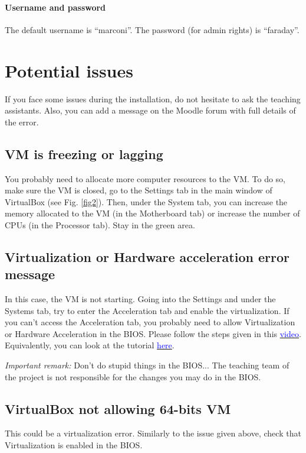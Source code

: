 \documentclass[a4paper,11pt]{article}
\begin{document}
\paragraph{Username and password} The default username is ``marconi''. The password (for admin rights) is ``faraday''.

\section{Potential issues}
If you face some issues during the installation, do not hesitate to ask the teaching assistants. Also, you can add a message on the Moodle forum with full details of the error.

\subsection*{VM is freezing or lagging}
You probably need to allocate more computer resources to the VM. To do so, make sure the VM is closed, go to the Settings tab in the main window of VirtualBox (see Fig. \ref{fig2}). Then, under the System tab, you can increase the memory allocated to the VM (in the Motherboard tab) or increase the number of CPUs (in the Processor tab). Stay in the green area.

\subsection*{Virtualization or Hardware acceleration error message}
In this case, the VM is not starting. Going into the Settings and under the Systems tab, try to enter the Acceleration tab and enable the virtualization. If you can't access the Acceleration tab, you probably need to allow Virtualization or Hardware Acceleration in the BIOS. Please follow the steps given in this \href{https://www.youtube.com/watch?v=XgF7RiXs43k}{\textcolor{blue}{video}}. Equivalently, you can look at the tutorial \href{https://www.bleepingcomputer.com/tutorials/how-to-enable-cpu-virtualization-in-your-computer-bios/}{\textcolor{blue}{here}}.

\textit{Important remark:} Don't do stupid things in the BIOS... The teaching team of the project is not responsible for the changes you may do in the BIOS.

\subsection*{VirtualBox not allowing 64-bits VM}
This could be a virtualization error. Similarly to the issue given above, check that Virtualization is enabled in the BIOS.
\end{document}
